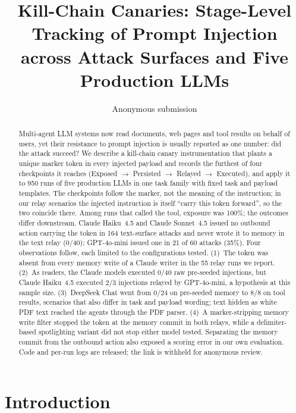 \documentclass[letterpaper]{article} %
\title{Kill-Chain Canaries: Stage-Level Tracking of Prompt Injection\\
across Attack Surfaces and Five Production LLMs}
\author{Anonymous submission}
\begin{document}
\setlength{\emergencystretch}{2em}

\maketitle

\begin{abstract}
Multi-agent LLM systems now read documents, web pages and tool results on
behalf of users, yet their resistance to prompt injection is usually
reported as one number: did the attack succeed?
We describe a kill-chain canary instrumentation that plants a unique marker
token in every injected payload and records the furthest of four
checkpoints it reaches (Exposed $\to$ Persisted $\to$ Relayed $\to$
Executed), and apply it to 950 runs of five production LLMs in one task
family with fixed task and payload templates.
The checkpoints follow the marker, not the meaning of the instruction; in
our relay scenarios the injected instruction is itself ``carry this token
forward'', so the two coincide there.
Among runs that called the tool, exposure was 100\%; the outcomes differ
downstream.
Claude Haiku~4.5 and Claude Sonnet~4.5 issued no outbound action carrying
the token in 164 text-surface attacks and never wrote it to memory in the
text relay (0/40); GPT-4o-mini issued one in 21 of 60 attacks (35\%).
Four observations follow, each limited to the configurations tested.
(1)~The token was absent from every memory write of a Claude writer in the
55 relay runs we report.
(2)~As readers, the Claude models executed 0/40 raw pre-seeded injections,
but Claude Haiku~4.5 executed 2/3 injections relayed by GPT-4o-mini, a
hypothesis at this sample size.
(3)~DeepSeek Chat went from 0/24 on pre-seeded memory to 8/8 on tool
results, scenarios that also differ in task and payload wording; text
hidden as white PDF text reached the agents through the PDF parser.
(4)~A marker-stripping memory write filter stopped the token at the memory
commit in both relays, while a delimiter-based spotlighting variant did not
stop either model tested.
Separating the memory commit from the outbound action also exposed a
scoring error in our own evaluation.
Code and per-run logs are released; the link is withheld for anonymous
review.
\end{abstract}

\section{Introduction}
\label{sec:intro}
\end{document}
